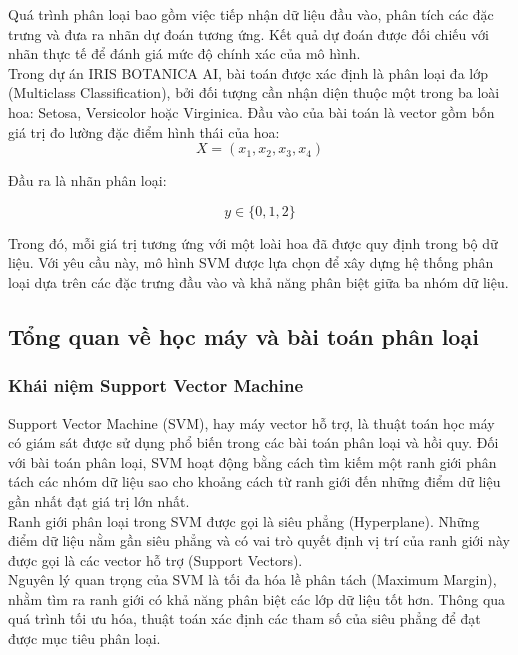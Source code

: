 \documentclass[14pt]{extarticle}
\begin{document}
	\noindent Quá trình phân loại bao gồm việc tiếp nhận dữ liệu đầu vào, phân tích các đặc trưng và đưa ra nhãn dự đoán tương ứng. Kết quả dự đoán được đối chiếu với nhãn thực tế để đánh giá mức độ chính xác của mô hình.\\
	
	\noindent Trong dự án IRIS BOTANICA AI, bài toán được xác định là phân loại đa lớp (Multiclass Classification), bởi đối tượng cần nhận diện thuộc một trong ba loài hoa: Setosa, Versicolor hoặc Virginica.
	\noindent Đầu vào của bài toán là vector gồm bốn giá trị đo lường đặc điểm hình thái của hoa:
	\begin{equation*}
		X = (x_1, x_2, x_3, x_4)
	\end{equation*}
	
	\noindent Đầu ra là nhãn phân loại:
	
	\begin{equation*}
		y \in \{0,1,2\}
	\end{equation*}
	 	
	\noindent Trong đó, mỗi giá trị tương ứng với một loài hoa đã được quy định trong bộ dữ liệu. Với yêu cầu này, mô hình SVM được lựa chọn để xây dựng hệ thống phân loại dựa trên các đặc trưng đầu vào và khả năng phân biệt giữa ba nhóm dữ liệu.
		\subsection{Tổng quan về học máy và bài toán phân loại }
		\subsubsection{Khái niệm Support Vector Machine}
	
	\noindent Support Vector Machine (SVM), hay máy vector hỗ trợ, là thuật toán học máy có giám sát được sử dụng phổ biến trong các bài toán phân loại và hồi quy. Đối với bài toán phân loại, SVM hoạt động bằng cách tìm kiếm một ranh giới phân tách các nhóm dữ liệu sao cho khoảng cách từ ranh giới đến những điểm dữ liệu gần nhất đạt giá trị lớn nhất.\\
	
	\noindent Ranh giới phân loại trong SVM được gọi là siêu phẳng (Hyperplane). Những điểm dữ liệu nằm gần siêu phẳng và có vai trò quyết định vị trí của ranh giới này được gọi là các vector hỗ trợ (Support Vectors).\\
	
	\noindent Nguyên lý quan trọng của SVM là tối đa hóa lề phân tách (Maximum Margin), nhằm tìm ra ranh giới có khả năng phân biệt các lớp dữ liệu tốt hơn. Thông qua quá trình tối ưu hóa, thuật toán xác định các tham số của siêu phẳng để đạt được mục tiêu phân loại.\\
	
\end{document}
